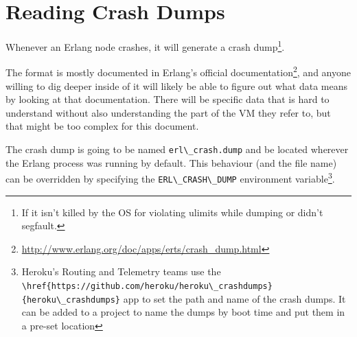\documentclass[11pt, oneside]{book}   	%
\newcommand{\filename}[1]{\Verb`#1`}
\newcommand{\otpapp}[1]{\Verb`#1`}
\newcommand{\command}[1]{\Verb`#1`}
\begin{document}


\chapter{Reading Crash Dumps}
\label{chap:crash-dumps}

Whenever an Erlang node crashes, it will generate a crash dump\footnote{If it isn't killed by the OS for violating ulimits while dumping or didn't segfault.}.

The format is mostly documented in Erlang's official documentation\footnote{\href{http://www.erlang.org/doc/apps/erts/crash\_dump.html}{http://www.erlang.org/doc/apps/erts/crash\_dump.html}}, and anyone willing to dig deeper inside of it will likely be able to figure out what data means by looking at that documentation. There will be specific data that is hard to understand without also understanding the part of the VM they refer to, but that might be too complex for this document.

The crash dump is going to be named \filename{erl\_crash.dump} and be located wherever the Erlang process was running by default. This behaviour (and the file name) can be overridden by specifying the \command{ERL\_CRASH\_DUMP} environment variable\footnote{Heroku's Routing and Telemetry teams use the \otpapp{\href{https://github.com/heroku/heroku\_crashdumps}{heroku\_crashdumps}} app to set the path and name of the crash dumps. It can be added to a project to name the dumps by boot time and put them in a pre-set location}.
\end{document}

